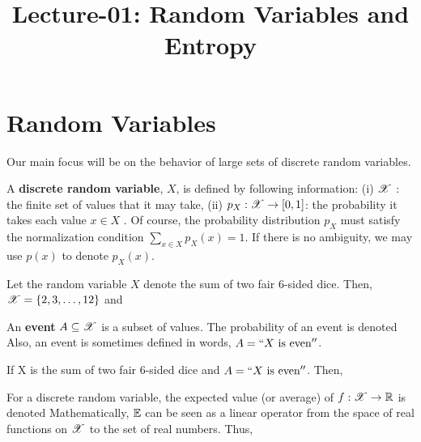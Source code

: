 \documentclass[letterpaper,10pt,english]{article}
\title{Lecture-01: Random Variables and Entropy}
\author{}
\begin{document}
\maketitle

\section{Random Variables} 

Our main focus will be on the behavior of large sets of discrete random variables. 
\begin{defn} 
A \textbf{discrete random variable}, $X$, is defined by following information: 
(i) $\mathscr{X}$ : the finite set of values that it may take, 
(ii) $p_X : \mathscr{X} \to [0, 1]$: the probability it takes each value $x \in X$ . 
Of course, the probability distribution $p_X$ must satisfy the normalization condition $\sum_{x \in X}p_X (x) = 1$. 
If there is no ambiguity, we may use $p(x)$ to denote $p_X (x)$. 
\end{defn}
\begin{shaded*}\begin{exmp}
Let the random variable $X$ denote the sum of two fair 6-sided dice. 
Then, $\mathscr{X} = \left\{2, 3, \dots, 12\right\}$ and 
\end{exmp}\end{shaded*}
\begin{defn}
An \textbf{event} $A \subseteq \mathscr{X}$ is a subset of values. 
The probability of an event is denoted 
Also, an event is sometimes defined in words, $A = ``X \text{ is even}''$.
\end{defn}
\begin{shaded*}\begin{exmp} 
If X is the sum of two fair 6-sided dice and $A = ``X \text{ is even}''$. Then, 
\end{exmp}\end{shaded*}
\begin{defn} 
For a discrete random variable, the expected value (or average) of $f : \mathscr{X} \to \mathbb{R}$ is denoted
Mathematically, $\mathbb{E}{}$ can be seen as a linear operator from the space of real functions on $\mathscr{X}$ to the set of real numbers. 
Thus,
\end{defn}
\end{document}
